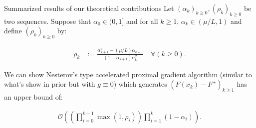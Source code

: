 \documentclass[11pt]{beamer}
\theoremstyle{definition}
\begin{document}
        \begin{frame}{Summarized results of our theoretical contributions}
            Let $(\alpha_k)_{k \ge0}, (\rho_k)_{k \ge 0}$ be two sequences. 
            Suppose that $\alpha_0 \in (0, 1]$ and for all $k \ge 1$, $\alpha_k \in (\mu/L, 1)$ and define $(\rho_k)_{k\ge0 }$ by: 
            \begin{tcolorbox}\noindent\vspace{-1em}
                \begin{align*}
                    \rho_k &:= \frac{\alpha_{k + 1}^2 - (\mu/L)\alpha_{k + 1}}{(1 - \alpha_{k + 1})\alpha_k^2} \quad \forall (k \ge 0).
                \end{align*}
            \end{tcolorbox}
            We can show Nesterov's type accelerated proximal gradient algorithm (similar to what's show in prior but with $g \equiv 0$) which generates $(F(x_k) - F^+)_{k\ge 1}$ has an upper bound of: 
            \begin{tcolorbox}\noindent\vspace{-1em} 
                \begin{align*}
                    \mathcal O\left(
                        \left(
                            \prod_{i = 0}^{k - 1} \max(1, \rho_{i})
                        \right)
                        \prod_{i = 1}^{k} \left(1  - \alpha_i\right)
                    \right).
                \end{align*}
            \end{tcolorbox}
        \end{frame}
\end{document}
